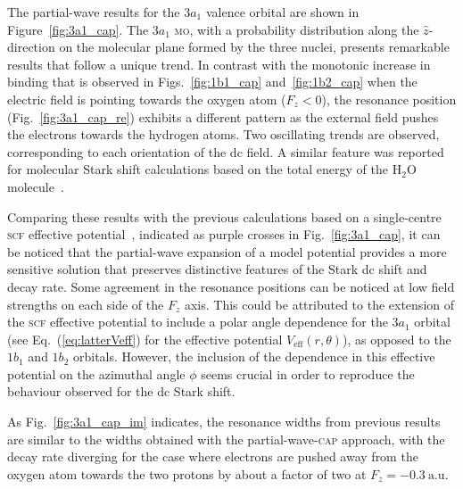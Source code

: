 The partial-wave results for the $3a_{1}$ valence orbital are shown in
Figure~\ref{fig:3a1_cap}. The $3a_{1}$ \textsc{mo}, with a probability
distribution along the $\hat{z}$-direction on the molecular plane
formed by the three nuclei, presents remarkable results that follow a
unique trend. In contrast with the monotonic increase in binding that
is observed in Figs.~\ref{fig:1b1_cap} and~\ref{fig:1b2_cap} when the
electric field is pointing towards the oxygen atom ($F_{z} < 0$), the
resonance position (Fig.~\ref{fig:3a1_cap_re}) exhibits a different
pattern as the external field pushes the electrons towards the
hydrogen atoms. Two oscillating trends are observed, corresponding to
each orientation of the dc field. A similar feature was reported for
molecular Stark shift calculations based on the total energy of the
H$_{2}$O molecule~\cite{Jagau_manybody_H2O}.


Comparing these results with the previous calculations based on a
single-centre \textsc{scf} effective potential~\cite{sarias_2017},
indicated as purple crosses in Fig.~\ref{fig:3a1_cap}, it can be
noticed that the partial-wave expansion of a model potential provides
a more sensitive solution that preserves distinctive features of the
Stark dc shift and decay rate. Some agreement in the resonance
positions can be noticed at low field strengths on each side of the
$F_{z}$ axis. This could be attributed to the extension of the
\textsc{scf} effective potential to include a polar angle dependence
for the $3a_{1}$ orbital (see Eq.~(\ref{eq:latterVeff}) for the
effective potential $V_{\mathrm{eff}}(r,\theta)$), as opposed to the
$1b_{1}$ and $1b_{2}$ orbitals. However, the inclusion of the
dependence in this effective potential on the azimuthal angle $\phi$
seems crucial in order to reproduce the behaviour observed for the dc
Stark shift.

As Fig.~\ref{fig:3a1_cap_im} indicates, the resonance widths from
previous results are similar to the widths obtained with the
partial-wave-\textsc{cap} approach, with the decay rate diverging for
the case where electrons are pushed away from the oxygen atom towards
the two protons by about a factor of two at $F_{z} =
-0.3\ \mathrm{a.u.}$



